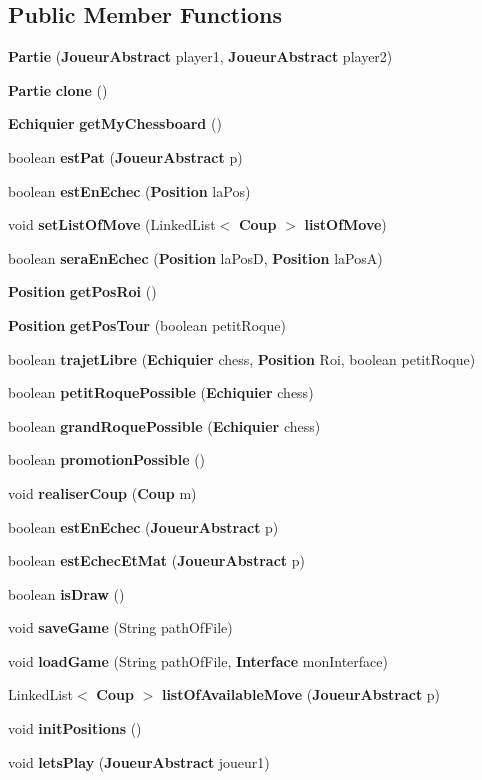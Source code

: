 \subsection*{Public Member Functions}
\begin{DoxyCompactItemize}
\item 
{\bf Partie} ({\bf Joueur\-Abstract} player1, {\bf Joueur\-Abstract} player2)
\item 
{\bf Partie} {\bf clone} ()
\item 
{\bf Echiquier} {\bf get\-My\-Chessboard} ()
\item 
boolean {\bf est\-Pat} ({\bf Joueur\-Abstract} p)
\item 
boolean {\bf est\-En\-Echec} ({\bf Position} la\-Pos)
\item 
void {\bf set\-List\-Of\-Move} (Linked\-List$<$ {\bf Coup} $>$ {\bf list\-Of\-Move})
\item 
boolean {\bf sera\-En\-Echec} ({\bf Position} la\-Pos\-D, {\bf Position} la\-Pos\-A)
\item 
{\bf Position} {\bf get\-Pos\-Roi} ()
\item 
{\bf Position} {\bf get\-Pos\-Tour} (boolean petit\-Roque)
\item 
boolean {\bf trajet\-Libre} ({\bf Echiquier} chess, {\bf Position} Roi, boolean petit\-Roque)
\item 
boolean {\bf petit\-Roque\-Possible} ({\bf Echiquier} chess)
\item 
boolean {\bf grand\-Roque\-Possible} ({\bf Echiquier} chess)
\item 
boolean {\bf promotion\-Possible} ()
\item 
void {\bf realiser\-Coup} ({\bf Coup} m)
\item 
boolean {\bf est\-En\-Echec} ({\bf Joueur\-Abstract} p)
\item 
boolean {\bf est\-Echec\-Et\-Mat} ({\bf Joueur\-Abstract} p)
\item 
boolean {\bf is\-Draw} ()
\item 
void {\bf save\-Game} (String path\-Of\-File)
\item 
void {\bf load\-Game} (String path\-Of\-File, {\bf Interface} mon\-Interface)
\item 
Linked\-List$<$ {\bf Coup} $>$ {\bf list\-Of\-Available\-Move} ({\bf Joueur\-Abstract} p)
\item 
void {\bf init\-Positions} ()
\item 
void {\bf lets\-Play} ({\bf Joueur\-Abstract} joueur1)
\item 

\end{DoxyCompactItemize}
